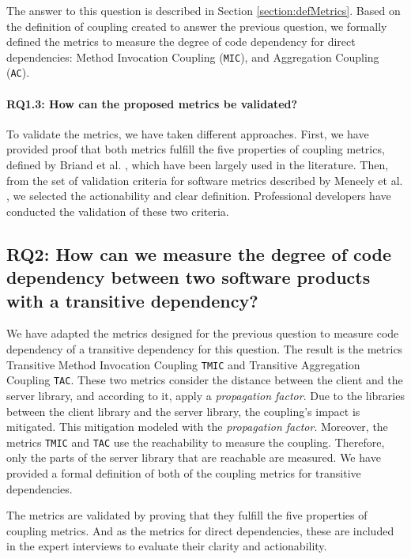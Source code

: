 The answer to this question is described in Section \ref{section:defMetrics}. Based on the definition of coupling created to answer the previous question, we formally defined the metrics to measure the degree of code dependency for direct dependencies: Method Invocation Coupling (\texttt{MIC}), and Aggregation Coupling (\texttt{AC}).

\paragraph{RQ1.3: How can the proposed metrics be validated?}

To validate the metrics, we have taken different approaches. First, we have provided proof that both metrics fulfill the five properties of coupling metrics, defined by Briand et al. \cite{briand1996property}, which have been largely used in the literature. Then, from the set of validation criteria for software metrics described by Meneely et al. \cite{Meneely2012}, we selected the actionability and clear definition. Professional developers have conducted the validation of these two criteria.

\subsection{RQ2: How can we measure the degree of code dependency between two software products with a transitive dependency?}

We have adapted the metrics designed for the previous question to measure code dependency of a transitive dependency for this question. The result is the metrics Transitive Method Invocation Coupling \texttt{TMIC} and Transitive Aggregation Coupling \texttt{TAC}. These two metrics consider the distance between the client and the server library, and according to it, apply a \textit{propagation factor}. Due to the libraries between the client library and the server library, the coupling's impact is mitigated. This mitigation modeled with the \textit{propagation factor}. Moreover, the metrics \texttt{TMIC} and \texttt{TAC} use the reachability to measure the coupling. Therefore, only the parts of the server library that are reachable are measured. We have provided a formal definition of both of the coupling metrics for transitive dependencies.

The metrics are validated by proving that they fulfill the five properties of coupling metrics. And as the metrics for direct dependencies, these are included in the expert interviews to evaluate their clarity and actionability.

